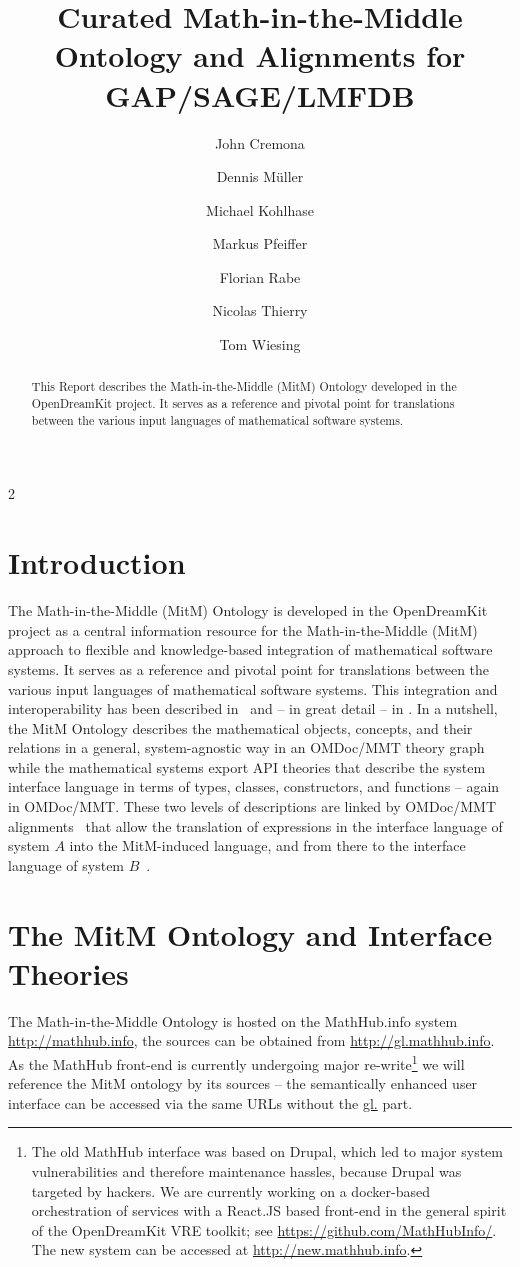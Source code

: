 \documentclass[book]{deliverablereport}
\title{Curated Math-in-the-Middle Ontology and Alignments for GAP/SAGE/LMFDB}
\author{John Cremona}
\author{Dennis M\"uller}
\author{Michael Kohlhase}
\author{Markus Pfeiffer}
\author{Florian Rabe}
\author{Nicolas Thierry}
\author{Tom Wiesing}
\begin{document}
\begin{abstract}
  This Report describes the Math-in-the-Middle (MitM) Ontology developed in the
  OpenDreamKit project. It serves as a reference and pivotal point for translations
  between the various input languages of mathematical software systems. 
\end{abstract}
\maketitle
\newpage\setcounter{tocdepth}2\tableofcontents\newpage

\section{Introduction}
The Math-in-the-Middle (MitM) Ontology is developed in the OpenDreamKit project as a
central information resource for the Math-in-the-Middle (MitM) approach to flexible and
knowledge-based integration of mathematical software systems. It serves as a reference and
pivotal point for translations between the various input languages of mathematical
software systems. This integration and interoperability has been described
in~\cite{DehKohKon:iop16,WieKohRab:vtuimkb17,KohMuePfe:kbimss17} and -- in great detail --
in \cite{ODK-D6.5}. In a nutshell, the MitM Ontology describes the mathematical objects,
concepts, and their relations in a general, system-agnostic way in an OMDoc/MMT theory
graph while the mathematical systems export API theories that describe the system
interface language in terms of types, classes, constructors, and functions -- again in
OMDoc/MMT. These two levels of descriptions are linked by OMDoc/MMT
alignments~\cite{MueGauKal:cacfms17} that allow the translation of expressions in the
interface language of system $A$ into the MitM-induced language, and from there to the
interface language of system $B$~\cite{MueRoYuRa:abtafs17}.

\section{The MitM Ontology and Interface Theories}
The Math-in-the-Middle Ontology is hosted on the MathHub.info system
\url{http://mathhub.info}, the sources can be obtained from
\url{http://gl.mathhub.info}. As the MathHub front-end is currently undergoing major
re-write\footnote{The old MathHub interface was based on Drupal, which led to major system
  vulnerabilities and therefore maintenance hassles, because Drupal was targeted by
  hackers. We are currently working on a docker-based orchestration of services with a
  React.JS based front-end in the general spirit of the OpenDreamKit VRE toolkit; see
  \url{https://github.com/MathHubInfo/}. The new system can be accessed at
  \url{http://new.mathhub.info}.} we will reference the MitM ontology by its sources --
the semantically enhanced user interface can be accessed via the same URLs without the
\url{gl.} part.
\end{document}
